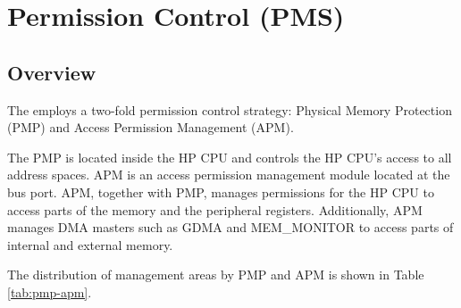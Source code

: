 \documentclass[main\_\_EN.tex]{subfiles}
\begin{document}

\ifglobal
\else
    \listoftodos
    {\let\clearpage\relax \listofdonetodos}
    \tableofcontents
\fi



\hypertarget{permctrl}{}
\chapter{Permission Control (PMS)}
\label{mod:permctrl}

\section{Overview}

The \chipname{} employs a two-fold permission control strategy: Physical Memory Protection (PMP) and Access Permission Management (APM).

The PMP is located inside the HP CPU and controls the HP CPU's access to all address spaces. APM is an access permission management module located at the bus port. APM, together with PMP, manages permissions for the HP CPU to access parts of the memory and the peripheral registers. Additionally, APM manages DMA masters such as GDMA and MEM\_MONITOR to access parts of internal and external memory.

The distribution of management areas by PMP and APM is shown in Table \ref{tab:pmp-apm}.
\end{document}
